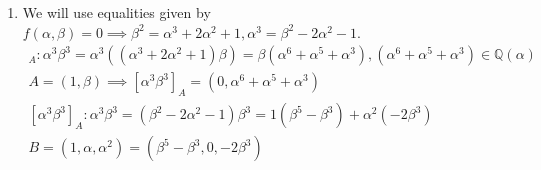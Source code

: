 \documentclass[12pt, a4paper]{article}
\begin{document}
\begin{enumerate}[label=(\alph*)]
\item We will use equalities given by $f(\alpha, \beta) = 0 \implies \beta^2 = \alpha^3+2\alpha^2+1, \alpha^3 = \beta^2-2\alpha^2-1$.
\begin{gather*}
[\alpha^3\beta^3]_A: \alpha^3\beta^3 = \alpha^3((\alpha^3+2\alpha^2+1)\beta) = \beta(\alpha^6+\alpha^5+\alpha^3), (\alpha^6+\alpha^5+\alpha^3) \in \mathbb{Q}(\alpha)\\
A=(1,\beta) \implies [\alpha^3\beta^3]_A = (0, \alpha^6+\alpha^5+\alpha^3)\\
[\alpha^3\beta^3]_A: \alpha^3\beta^3 = (\beta^2-2\alpha^2-1)\beta^3 = 1(\beta^5-\beta^3) + \alpha^2(-2\beta^3)\\
B = (1, \alpha, \alpha^2) = (\beta^5-\beta^3, 0, -2\beta^3)
\end{gather*}
\end{enumerate}
\end{document}
